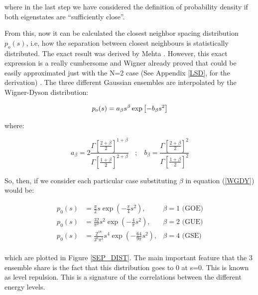 \documentclass[11pt,a4paper]{article}
\begin{document}
{\noindent where in the last step we have considered the definition of probability density if both eigenstates are \textquotedblleft sufficiently close\textquotedblright.}

From this, now it can be calculated the closest neighbor spacing distribution $p_o(s)$, i.e, how the separation between closest neighbours is statistically distributed. The exact result was derived by Mehta \cite{mehta_random_2004}. However, this exact expression is a really cumbersome and Wigner already proved that could be easily approximated just with the N=2 case (See Appendix \ref{LSD}, for the derivation) \cite{wigner_statistical_1951}. The three different Gaussian ensembles are interpolated by the Wigner-Dyson distribution:

\begin{equation}\LA{WGDY}
    p_o(s) = a_\beta s^\beta \exp\left[-b_\beta s^2\right]
\end{equation}

{\noindent where:}

\begin{equation}
    a_\beta=2\frac{\Gamma\left[\frac{2+\beta}{2}\right]^{1+\beta}}{\Gamma\left[\frac{1+\beta}{2}\right]^{2+\beta}} ~~~~;~~~~ b_\beta=\frac{\Gamma\left[\frac{2+\beta}{2}\right]^{2}}{\Gamma\left[\frac{1+\beta}{2}\right]^{2}}
\end{equation}


{\noindent So, then, if we consider each particular case substituting $\beta$ in equation (\ref{WGDY}) would be:}

\begin{equation}
    \begin{aligned}
        p_0(s) &= \frac{\pi}{2}s\exp\left(-\frac{\pi}{4}s^2\right) , &\beta = 1 \text{ (GOE)}\\
        p_0(s) &= \frac{32}{\pi^2}s^2\exp\left(-\frac{4}{\pi}s^2\right) , &\beta = 2 \text{ (GUE)}\\
        p_0(s) &= \frac{2^{18}}{3^6\pi^3}s^4\exp\left(-\frac{64}{9\pi}s^2\right) , &\beta = 4 \text{ (GSE)}\\
    \end{aligned}
\end{equation}

{\noindent which are plotted in Figure \ref{SEP_DIST}. The main important feature that the 3 ensemble share is the fact that this distribution goes to 0 at s=0. This is known as level repulsion. This is a signature of the correlations between the different energy levels.}
\end{document}
